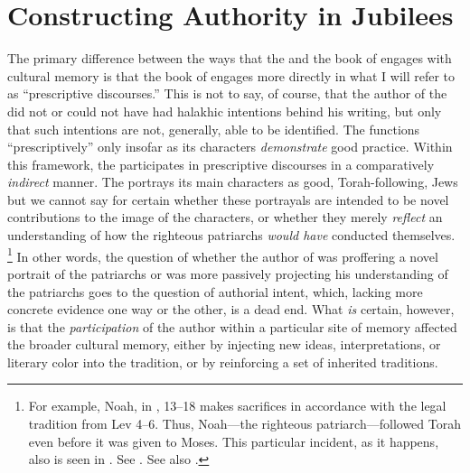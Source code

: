 
\section{Constructing Authority in Jubilees}

The primary difference between the ways that the \ga and the book of \jub engages with cultural memory is that the book of \jub engages more directly in what I will refer to as ``prescriptive discourses.'' This is not to say, of course, that the author of the \ga did not or could not have had halakhic intentions behind his writing, but only that such intentions are not, generally, able to be identified. The \ga functions ``prescriptively'' only insofar as its characters \emph{demonstrate} good practice. Within this framework, the \ga participates in prescriptive discourses in a comparatively \emph{indirect} manner. The \ga portrays its main characters as good, Torah-following, Jews but we cannot say for certain whether these portrayals are intended to be novel contributions to the image of the characters, or whether they merely \emph{reflect} an understanding of how the righteous patriarchs \emph{would have} conducted themselves.%
    \footnote{For example, Noah, in , 13--18 makes sacrifices in accordance with the legal tradition from Lev 4--6. Thus, Noah---the righteous patriarch---followed Torah even before it was given to Moses. This particular incident, as it happens, also is seen in \jub. See \cite[112]{crawford2008}. See also \cite[419]{reeves_revq1986}.}
In other words, the question of whether the author of \ga was proffering a novel portrait of the patriarchs or was more passively projecting his understanding of the patriarchs goes to the question of authorial intent, which, lacking more concrete evidence one way or the other, is a dead end. What \emph{is} certain, however, is that the \emph{participation} of the author within a particular site of memory affected the broader cultural memory, either by injecting new ideas, interpretations, or literary color into the tradition, or by reinforcing a set of inherited traditions.

